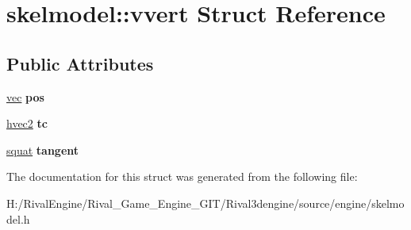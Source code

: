 \hypertarget{structskelmodel_1_1vvert}{}\section{skelmodel\+:\+:vvert Struct Reference}
\label{structskelmodel_1_1vvert}
\subsection*{Public Attributes}
\begin{DoxyCompactItemize}
\item 
\mbox{\label{structskelmodel_1_1vvert_a3f4fb03f2ea7bcaf98363f1fd6502356}} 
\hyperlink{structvec}{vec} {\bfseries pos}
\item 
\mbox{\label{structskelmodel_1_1vvert_add2b245140d13cc111f33599e3ae2e88}} 
\hyperlink{structhvec2}{hvec2} {\bfseries tc}
\item 
\mbox{\label{structskelmodel_1_1vvert_a300395e947edc3434c47009b28b2c422}} 
\hyperlink{structsquat}{squat} {\bfseries tangent}
\end{DoxyCompactItemize}


The documentation for this struct was generated from the following file\+:\begin{DoxyCompactItemize}
\item 
H\+:/\+Rival\+Engine/\+Rival\+\_\+\+Game\+\_\+\+Engine\+\_\+\+G\+I\+T/\+Rival3dengine/source/engine/skelmodel.\+h\end{DoxyCompactItemize}
